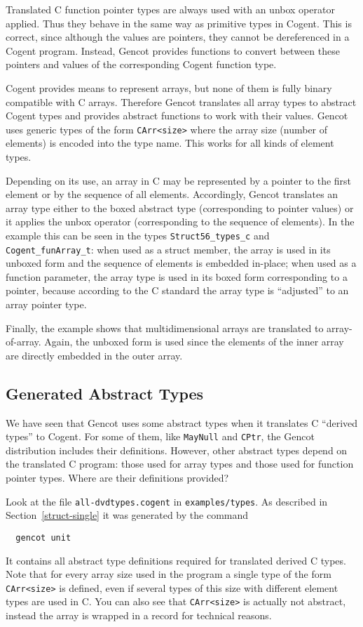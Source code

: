 \documentclass[a4paper]{report}
\newcommand{\code}[1]{\textnormal{\texttt{#1}}}
\begin{document}
Translated C function pointer types are always used with an unbox operator applied. Thus they behave in the same way as 
primitive types in Cogent. This is correct, since although the values are pointers, they cannot be dereferenced in 
a Cogent program. Instead, Gencot provides functions to convert between these pointers and values of the corresponding
Cogent function type.

Cogent provides means to represent arrays, but none of them is fully binary compatible with C arrays. Therefore Gencot
translates all array types to abstract Cogent types and provides abstract functions to work with their values. Gencot
uses generic types of the form \code{CArr<size>} where the array size (number of elements) is encoded into the type name.
This works for all kinds of element types.

Depending on its use, an array in C may be represented by a pointer to the first element or by the sequence of all elements.
Accordingly, Gencot translates an array type either to the boxed abstract type (corresponding to pointer values) or it
applies the unbox operator (corresponding to the sequence of elements). In the example this can be seen in the types 
\code{Struct56\_types\_c} and \code{Cogent\_funArray\_t}: when used as a struct member, the array is used in its unboxed
form and the sequence of elements is embedded in-place; when used as a function parameter, the array type is used in 
its boxed form corresponding to a pointer, because according to the C standard the array type is ``adjusted'' to an array
pointer type.

Finally, the example shows that multidimensional arrays are translated to array-of-array. Again, the unboxed form is used
since the elements of the inner array are directly embedded in the outer array.

\subsection{Generated Abstract Types}
\label{types-auto-gen}

We have seen that Gencot uses some abstract types when it translates C ``derived types'' to Cogent. For some of them, like 
\code{MayNull} and \code{CPtr}, the Gencot distribution includes their definitions. However, other abstract types
depend on the translated C program: those used for array types and those used for function pointer types. Where
are their definitions provided?

Look at the file \code{all-dvdtypes.cogent} in \code{examples/types}. As described in Section~\ref{struct-single} it was 
generated by the command
\begin{verbatim}
  gencot unit
\end{verbatim}
It contains all abstract type definitions required for translated derived C types. Note that for every array
size used in the program a single type of the form \code{CArr<size>} is defined, even if several types of this
size with different element types are used in C. You can also see that \code{CArr<size>} is actually not abstract, 
instead the array is wrapped in a record for technical reasons.
\end{document}
